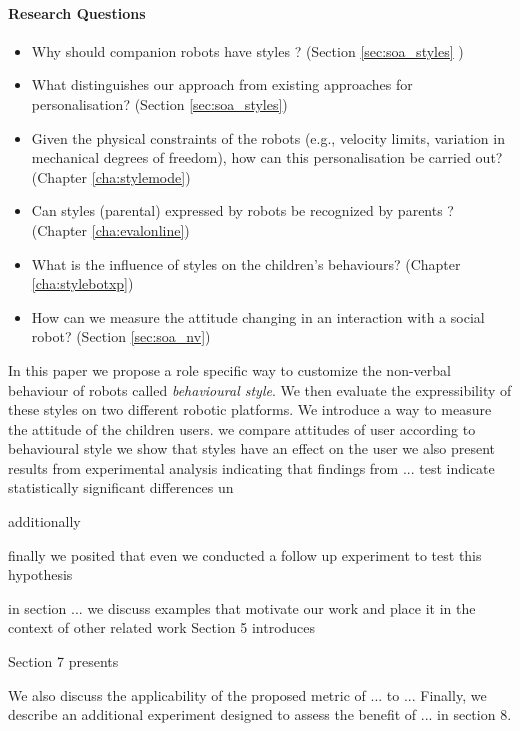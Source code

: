\documentclass[a4paper,twocolumn]{svjour3}
\begin{document}
\paragraph{Research Questions}
\begin{itemize}[noitemsep,nolistsep]
	\item Why should companion robots have styles ? (Section \ref{sec:soa_styles} )
	\item What distinguishes our approach from existing approaches for personalisation? (Section \ref{sec:soa_styles})
	\item Given the physical constraints of the robots (e.g., velocity limits, variation in mechanical degrees of freedom), how can this personalisation be carried out?(Chapter \ref{cha:stylemode})
	\item Can styles (parental) expressed by robots be recognized by parents ? (Chapter \ref{cha:evalonline})
	\item What is the influence of styles on the children's behaviours? (Chapter \ref{cha:stylebotxp})
	\item How can we measure the attitude changing in an interaction with a social robot? (Section \ref{sec:soa_nv})
	\end{itemize}

In this paper we propose a role specific way to customize the non-verbal behaviour of robots called \emph{behavioural style}.
We then evaluate the expressibility of these styles on two different robotic platforms.
We introduce a way to measure the attitude of the children users.
we compare attitudes of user according to behavioural style
we show that styles have an effect on the user
we also present results from experimental analysis indicating that 
findings from ... test indicate  statistically significant differences un 

additionally

finally we posited that even 
we conducted a follow up experiment to test this hypothesis

in section ... we discuss examples that motivate our work and place it in the context of other related work
Section 5 introduces

Section 7 presents 

We also discuss the applicability of the proposed metric of ... to ...
Finally, we describe an additional experiment designed to assess the benefit of ... in section 8.
\end{document}
